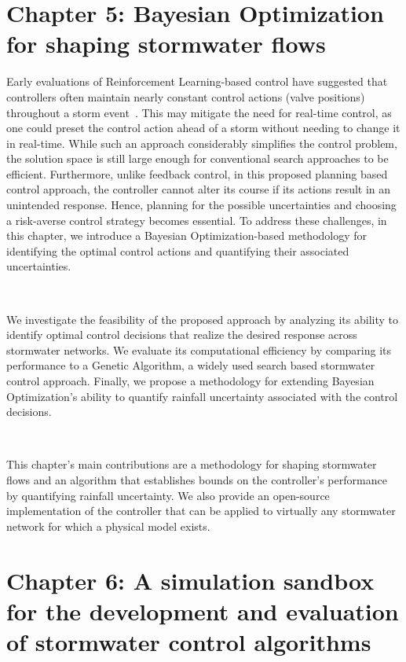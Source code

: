 \section{Chapter 5: Bayesian Optimization for shaping stormwater flows}

Early evaluations of Reinforcement Learning-based control have suggested that controllers often maintain nearly constant control actions (valve positions) throughout a storm event~\cite{Mullapudi_Lewis_Gruden_Kerkez_2020}.
This may mitigate the need for real-time control, as one could preset the control action ahead of a storm without needing to change it in real-time. 
While such an approach considerably simplifies the control problem, the solution space is still large enough for conventional search approaches to be efficient.
Furthermore, unlike feedback control, in this proposed planning based control approach, the controller cannot alter its course if its actions result in an unintended response. 
Hence, planning for the possible uncertainties and choosing a risk-averse control strategy becomes essential.
To address these challenges, in this chapter, we introduce a Bayesian Optimization-based methodology for identifying the optimal control actions and quantifying their associated uncertainties.

\

We investigate the feasibility of the proposed approach by analyzing its ability to identify optimal control decisions that realize the desired response across stormwater networks.
We evaluate its computational efficiency by comparing its performance to a Genetic Algorithm, a widely used search based stormwater control approach.
Finally, we propose a methodology for extending Bayesian Optimization's ability to quantify rainfall uncertainty associated with the control decisions.

\

This chapter's main contributions are a methodology for shaping stormwater flows and an algorithm that establishes bounds on the controller's performance by quantifying rainfall uncertainty.
We also provide an open-source implementation of the controller that can be applied to virtually any stormwater network for which a physical model exists.

\section[\texttt{Chapter 6: pystorms}]{Chapter 6: A simulation sandbox for the development and evaluation of stormwater control algorithms}

